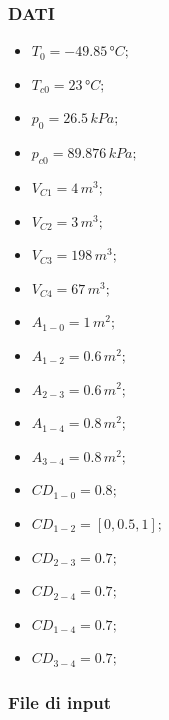 \documentclass{article}
\begin{document}
        \subsubsection{DATI}
        \begin{itemize}
            \item $\displaystyle T_0 = -49.85\,°C;$ \
            \item $\displaystyle T_{c0} = 23\,°C;$ \
            \item $\displaystyle p_0 = 26.5\,kPa;$ \
            \item $\displaystyle p_{c0} = 89.876\,kPa;$ \
            \item $\displaystyle V_{C1} = 4\,m^3;$ \
            \item $\displaystyle V_{C2} = 3\,m^3;$ \
            \item $\displaystyle V_{C3} = 198\,m^3;$ \
            \item $\displaystyle V_{C4} = 67\,m^3;$ \
            \item $\displaystyle A_{1-0} = 1\,m^2;$ \
            \item $\displaystyle A_{1-2} = 0.6\,m^2;$ \
            \item $\displaystyle A_{2-3} = 0.6\,m^2;$ \
            \item $\displaystyle A_{1-4} = 0.8\,m^2;$ \
            \item $\displaystyle A_{3-4} = 0.8\,m^2;$ \
            \item $\displaystyle CD_{1-0} = 0.8;$ \
            \item $\displaystyle CD_{1-2} = [0, 0.5, 1];$ \
            \item $\displaystyle CD_{2-3} = 0.7;$ \
            \item $\displaystyle CD_{2-4} = 0.7;$ \
            \item $\displaystyle CD_{1-4} = 0.7;$ \
            \item $\displaystyle CD_{3-4} = 0.7;$ \
        \end{itemize}
        \clearpage
        \subsubsection{File di input}
\end{document}
